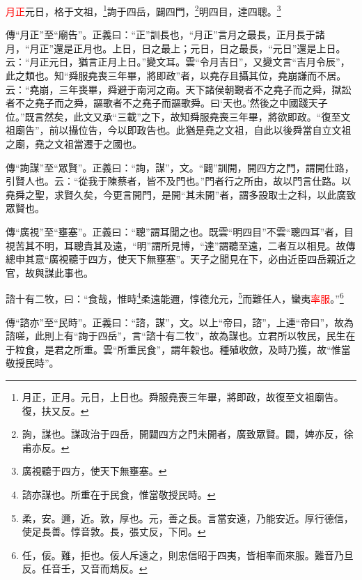 \textcolor{red}{月正}元日，格于文祖，\footnote{月正，正月。元日，上日也。舜服堯喪三年畢，將即政，故復至文祖廟告。復，扶又反。}詢于四岳，闢四門，\footnote{詢，謀也。謀政治于四岳，開闢四方之門未開者，廣致眾賢。闢，婢亦反，徐甫亦反。}明四目，達四聰。\footnote{廣視聽于四方，使天下無壅塞。}

{\noindent\zhuan{}\fzbyks 傳“月正”至“廟告”。正義曰：“正”訓長也，“月正”言月之最長，正月長于諸月，“月正”還是正月也。上日，日之最上；元日，日之最長，“元日”還是上日。云：“月正元日，猶言正月上日。”變文耳。雲“令月吉日”，又變文言“吉月令辰”，此之類也。知“舜服堯喪三年畢，將即政”者，以堯存且攝其位，堯崩謙而不居。云：“堯崩，三年喪畢，舜避于南河之南。天下諸侯朝覲者不之堯子而之舜，獄訟者不之堯子而之舜，謳歌者不之堯子而謳歌舜。曰‘天也。’然後之中國踐天子位。”既言然矣，此文又承“三載”之下，故知舜服堯喪三年畢，將欲即政。“復至文祖廟告”，前以攝位告，今以即政告也。此猶是堯之文祖，自此以後舜當自立文祖之廟，堯之文祖當遷于之國也。 \par}

{\noindent\zhuan{}\fzbyks 傳“詢謀”至“眾賢”。正義曰：“詢，謀”，文。“闢”訓開，開四方之門，謂開仕路，引賢人也。云：“從我于陳蔡者，皆不及門也。”門者行之所由，故以門言仕路。以堯舜之聖，求賢久矣，今更言開門，是開“其未開”者，謂多設取士之科，以此廣致眾賢也。 \par}

{\noindent\zhuan{}\fzbyks 傳“廣視”至“壅塞”。正義曰：“聰”謂耳聞之也。既雲“明四目”不雲“聰四耳”者，目視苦其不明，耳聰貴其及遠，“明”謂所見博，“達”謂聽至遠，二者互以相見。故傳總申其意“廣視聽于四方，使天下無壅塞”。天子之聞見在下，必由近臣四岳親近之官，故與謀此事也。 \par}

諮十有二牧，曰：“食哉，惟時\footnote{諮亦謀也。所重在于民食，惟當敬授民時。}柔遠能邇，惇德允元，\footnote{柔，安。邇，近。敦，厚也。元，善之長。言當安遠，乃能安近。厚行德信，使足長善。惇音敦。長，張丈反，下同。}而難任人，蠻夷\textcolor{red}{率服}。”\footnote{任，佞。難，拒也。佞人斥遠之，則忠信昭于四夷，皆相率而來服。難音乃旦反。任音壬，又音而鴆反。}

{\noindent\zhuan{}\fzbyks 傳“諮亦”至“民時”。正義曰：“諮，謀”，文。以上“帝曰，諮”，上連“帝曰”，故為諮嗟，此則上有“詢于四岳”，言“諮十有二牧”，故為謀也。立君所以牧民，民生在于粒食，是君之所重。雲“所重民食”，謂年穀也。種殖收斂，及時乃獲，故“惟當敬授民時”。 \par}

